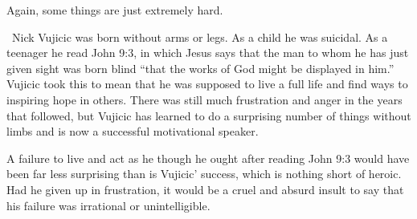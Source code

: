 \documentclass[11pt,letterpaper,oneside]{amsart}
\begin{document}







Again, some things are just extremely hard.\begin{squote}\ Nick Vujicic was born without arms or legs. As a child he was suicidal. As a teenager he read John 9:3, in which Jesus says that the man to whom he has just given sight was born blind ``that the works of God might be displayed in him.'' Vujicic took this to mean that he was supposed to live a full life and find ways to inspiring hope in others. There was still much frustration and anger in the years that followed, but Vujicic has learned to do a surprising number of things without limbs and is now a successful motivational speaker.\end{squote} A failure to live and act as he though he ought after reading John 9:3 would have been far less surprising than is Vujicic' success, which is nothing short of heroic. Had he given up in frustration, it would be a cruel and absurd insult to say that his failure was irrational or unintelligible.
\end{document}
